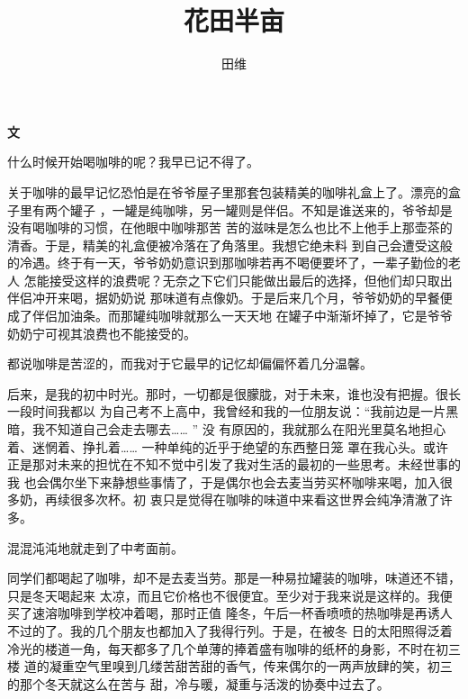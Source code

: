 \documentclass[12pt,a4paper]{article}
\newcommand{\newsect}[1]{
	\begingroup
	\clearpage
	\par \vspace{2.8em}
	\LARGE\bfseries\centering #1
	\phantomsection \addcontentsline{toc}{section}{#1}
	\par %
	\endgroup
}
\begin{document}
	\pagestyle{empty} 
	\title{花田半亩}
	\author{田维}
	\date{}
	\maketitle \thispagestyle{empty}

	\tableofcontents
	\clearpage
	\pagestyle{headings} 

	\setlength{\parskip}{1ex plus 1ex minus 0ex}

	\newsect{文} %


		什么时候开始喝咖啡的呢？我早已记不得了。

		关于咖啡的最早记忆恐怕是在爷爷屋子里那套包装精美的咖啡礼盒上了。漂亮的盒子里有两个罐子
	，一罐是纯咖啡，另一罐则是伴侣。不知是谁送来的，爷爷却是没有喝咖啡的习惯，在他眼中咖啡那苦
	苦的滋味是怎么也比不上他手上那壶茶的清香。于是，精美的礼盒便被冷落在了角落里。我想它绝未料
	到自己会遭受这般的冷遇。终于有一天，爷爷奶奶意识到那咖啡若再不喝便要坏了，一辈子勤俭的老人
	怎能接受这样的浪费呢？无奈之下它们只能做出最后的选择，但他们却只取出伴侣冲开来喝，据奶奶说
	那味道有点像奶。于是后来几个月，爷爷奶奶的早餐便成了伴侣加油条。而那罐纯咖啡就那么一天天地
	在罐子中渐渐坏掉了，它是爷爷奶奶宁可视其浪费也不能接受的。

		都说咖啡是苦涩的，而我对于它最早的记忆却偏偏怀着几分温馨。

		后来，是我的初中时光。那时，一切都是很朦胧，对于未来，谁也没有把握。很长一段时间我都以
	为自己考不上高中，我曾经和我的一位朋友说：“我前边是一片黑暗，我不知道自己会走去哪去…… ” 没
	有原因的，我就那么在阳光里莫名地担心着、迷惘着、挣扎着…… 一种单纯的近乎于绝望的东西整日笼
	罩在我心头。或许正是那对未来的担忧在不知不觉中引发了我对生活的最初的一些思考。未经世事的我
	也会偶尔坐下来静想些事情了，于是偶尔也会去麦当劳买杯咖啡来喝，加入很多奶，再续很多次杯。初
	衷只是觉得在咖啡的味道中来看这世界会纯净清澈了许多。

		混混沌沌地就走到了中考面前。

		同学们都喝起了咖啡，却不是去麦当劳。那是一种易拉罐装的咖啡，味道还不错，只是冬天喝起来
	太凉，而且它价格也不很便宜。至少对于我来说是这样的。我便买了速溶咖啡到学校冲着喝，那时正值
	隆冬，午后一杯香喷喷的热咖啡是再诱人不过的了。我的几个朋友也都加入了我得行列。于是，在被冬
	日的太阳照得泛着冷光的楼道一角，每天都多了几个单薄的捧着盛有咖啡的纸杯的身影，不时在初三楼
	道的凝重空气里嗅到几缕苦甜苦甜的香气，传来偶尔的一两声放肆的笑，初三的那个冬天就这么在苦与
	甜，冷与暖，凝重与活泼的协奏中过去了。
\end{document}
